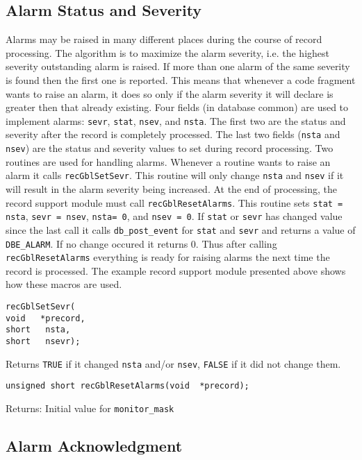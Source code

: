 \subsection{Alarm Status and Severity}

Alarms may be raised in many different places during the course of record processing.
The algorithm is to maximize the alarm severity, i.e. the highest severity outstanding alarm is raised.
If more than one alarm of the same severity is found then the first one is reported.
This means that whenever a code fragment wants to raise an alarm, it does so only if the alarm severity it will declare is greater then that already existing.
Four fields (in database common) are used to implement alarms:
\verb|sevr|, \verb|stat|, \verb|nsev|, and \verb|nsta|.
The first two are the status and severity after the record is completely processed.
The last two fields (\verb|nsta| and \verb|nsev|) are the status and severity values to set during record processing.
Two routines are used for handling alarms.
Whenever a routine wants to raise an alarm it calls \verb|recGblSetSevr|.
This routine will only change \verb|nsta| and \verb|nsev| if it will result in the alarm severity being increased.
At the end of processing, the record support module must call \verb|recGblResetAlarms|.
This routine sets \verb|stat = nsta|, \verb|sevr = nsev|, \verb|nsta= 0|, and \verb|nsev = 0|.
If \verb|stat| or \verb|sevr| has changed value since the last call it calls \verb|db_post_event| for \verb|stat| and \verb|sevr| and returns a value of \verb|DBE_ALARM|.
If no change occured it returns 0.
Thus after calling \verb|recGblResetAlarms| everything is ready for raising alarms the next time the record is processed.
The example record support module presented above shows how these macros are used.

\begin{verbatim}
recGblSetSevr(
void   *precord,
short   nsta,
short   nsevr);
\end{verbatim}

Returns \verb|TRUE| if it changed \verb|nsta| and/or \verb|nsev|, \verb|FALSE| if it did not change them.

\begin{verbatim}
unsigned short recGblResetAlarms(void  *precord);
\end{verbatim}

Returns: Initial value for \verb|monitor_mask|

\subsection{Alarm Acknowledgment}

